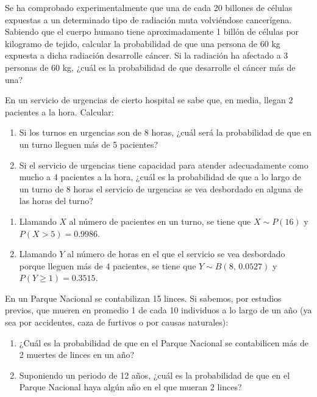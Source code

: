 {Se ha comprobado experimentalmente que una de cada 20 billones de células expuestas a un determinado tipo de radiación muta volviéndose
cancerígena. Sabiendo que el cuerpo humano tiene aproximadamente 1 billón de células por kilogramo de tejido, calcular la probabilidad de
que una persona de 60 kg expuesta a dicha radiación desarrolle cáncer. Si la radiación ha afectado a 3 personas de 60 kg, ¿cuál es la
probabilidad de que desarrolle el cáncer más de una? }
{}
{}


{En un servicio de urgencias de cierto hospital se sabe que, en media, llegan 2 pacientes a la hora.
Calcular:
\begin{enumerate}
\item Si los turnos en urgencias son de 8 horas, ¿cuál será la probabilidad de que en un turno lleguen más de 5 pacientes?
\item Si el servicio de urgencias tiene capacidad para atender adecuadamente como mucho a 4 pacientes a la hora, ¿cuál
es la probabilidad de que a lo largo de un turno de 8 horas el servicio de urgencias se vea desbordado en alguna de las
horas del turno?
\end{enumerate}
}
{
\begin{enumerate}
\item Llamando $X$ al número de pacientes en un turno, se tiene que $X\sim P(16)$ y $P(X>5)=0.9986$.
\item Llamando $Y$ al número de horas en el que el servicio se vea desbordado porque lleguen más de 4 pacientes, se
tiene que $Y\sim B(8,\,0.0527)$ y $P(Y\geq 1)=0.3515$.
\end{enumerate}
}
{}


{En un Parque Nacional se contabilizan 15 linces. Si sabemos, por estudios previos, que mueren en promedio 1 de cada 10 individuos a lo largo de un año (ya sea por accidentes, caza de furtivos o por causas naturales):
\begin{enumerate}
\item ¿Cuál es la probabilidad de que en el Parque Nacional se contabilicen más de 2 muertes de linces en un año?
\item Suponiendo un periodo de 12 años, ¿cuál es la probabilidad de que en el Parque Nacional haya algún año
en el que mueran 2 linces?
\end{enumerate}
}
{}
{}


